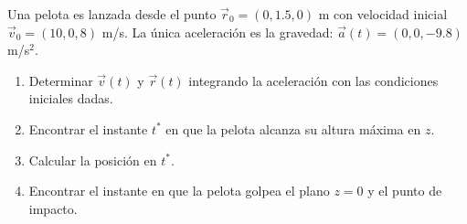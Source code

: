 Una pelota es lanzada desde el punto $\vec{r}_0 = (0, 1.5, 0)$ m con velocidad inicial $\vec{v}_0 = (10, 0, 8)$ m/s. La única aceleración es la gravedad: $\vec{a}(t) = (0, 0, -9.8)$ m/s$^2$.
\begin{enumerate}
    \item Determinar $\vec{v}(t)$ y $\vec{r}(t)$ integrando la aceleración con las condiciones iniciales dadas.
    \item Encontrar el instante $t^*$ en que la pelota alcanza su altura máxima en $z$.
    \item Calcular la posición en $t^*$.
    \item Encontrar el instante en que la pelota golpea el plano $z = 0$ y el punto de impacto.
\end{enumerate}
